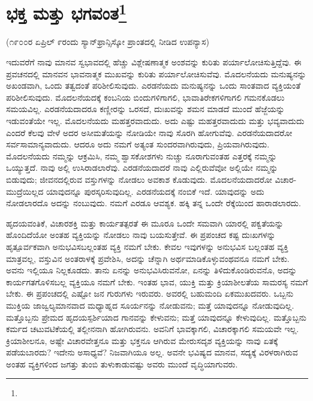 
\chapter{ಭಕ್ತ ಮತ್ತು ಭಗವಂತ\protect\footnote{}}

\begin{center}
(೧೯೦೦ರ ಏಪ್ರಿಲ್ ೯ರಂದು ಸ್ಯಾನ್‌ಫ್ರಾನ್ಸಿಸ್ಕೋ ಪ್ರಾಂತದಲ್ಲಿ ನೀಡಿದ ಉಪನ್ಯಾಸ)
\end{center}

ಇದುವರೆಗೆ ನಾವು ಮಾನವ ಸ್ವಭಾವದಲ್ಲಿ ಹೆಚ್ಚು ವಿಶ್ಲೇಷಣಾತ್ಮಕ ಅಂಶವನ್ನು ಕುರಿತು ಪರ್ಯಾಲೋಚಿಸುತ್ತಿದ್ದೆವು. ಈ ಪ್ರವಚನದಲ್ಲಿ ಮಾನವನ ಭಾವನಾತ್ಮಕ ಮುಖವನ್ನು ಕುರಿತು ಪರ್ಯಾಲೋಚಿಸುವೆವು. ಮೊದಲನೆಯದು ಮನುಷ್ಯನನ್ನು ಅಖಂಡವಾಗಿ, ಒಂದು ತತ್ವದಂತೆ ಪರಿಶೀಲಿಸುವುದು. ಎರಡನೆಯದು ಮನುಷ್ಯನನ್ನು ಒಂದು ಸಾಂತವಾದ ವ್ಯಕ್ತಿಯಂತೆ ಪರಿಶೀಲಿಸುವುದು. ಮೊದಲನೆಯದಕ್ಕೆ ಕಂಬನಿಯ ಬಿಂದುಗಳಿಗಾಗಲಿ, ಭಾವಾತಿರೇಕಗಳಿಗಾಗಲಿ ಗಮನಕೊಡಲು ಸಮಯವಿಲ್ಲ. ಎರಡನೆಯದಾದರೂ ಕಣ್ಣೀರನ್ನು ಒರಸದೆ, ದುಃಖವನ್ನು ಶಮನ ಮಾಡದೆ ಮುಂದೆ ಹೆಜ್ಜೆಯನ್ನು ಇಡುವಂತೆಯೇ ಇಲ್ಲ. ಮೊದಲನೆಯದು ಮಹತ್ತರವಾದುದು. ಅದು ಎಷ್ಟು ಮಹತ್ತರವಾದುದು ಮತ್ತು ಭವ್ಯವಾದುದು ಎಂದರೆ ಕೆಲವು ವೇಳೆ ಅದರ ಅಸೀಮತೆಯನ್ನು ನೋಡಿಯೇ ನಾವು ಸೊರಗಿ ಹೋಗುವೆವು. ಎರಡನೆಯದಾದರೋ ಸರ್ವಸಾಮಾನ್ಯವಾದುದು. ಆದರೂ ಅದು ನಮಗೆ ಅತ್ಯಂತ ಸುಂದರವಾಗಿರುವುದು, ಪ್ರಿಯವಾಗಿರುವುದು. ಮೊದಲನೆಯದು ನಮ್ಮನ್ನು ಆಕ್ರಮಿಸಿ, ನಮ್ಮ ಶ್ವಾಸಕೋಶಗಳು ನುಚ್ಚು ನೂರಾಗುವಂತಹ ಎತ್ತರಕ್ಕೆ ನಮ್ಮನ್ನು ಒಯ್ಯುತ್ತದೆ. ನಾವು ಅಲ್ಲಿ ಉಸಿರಾಡಲಾರೆವು. ಎರಡನೆಯದಾದರೆ ನಾವು ಎಲ್ಲಿರುವೆವೋ ಅಲ್ಲಿಯೇ ನಮ್ಮನ್ನು ಬಿಡುವುದು; ಜೀವನದಲ್ಲಿರುವ ವಸ್ತುಗಳನ್ನು ನೋಡಲು ಅವಕಾಶ ಕೊಡುವುದು. ಮೊದಲನೆಯದಾದರೋ ವಿಚಾರ-ಮುದ್ರೆಯಿಲ್ಲದ ಯಾವುದನ್ನೂ ಪುರಸ್ಕರಿಸುವುದಿಲ್ಲ. ಎರಡನೆಯದಕ್ಕೆ ನಂಬಿಕೆ ಇದೆ. ಯಾವುದನ್ನು ಅದು ನೋಡಲಾರದೊ ಅದನ್ನು ನಂಬುವುದು. ನಮಗೆ ಎರಡೂ ಆವಶ್ಯಕ. ಹಕ್ಕಿ ತನ್ನ ಒಂದೇ ರೆಕ್ಕೆಯಿಂದ ಹಾರಾಡಲಾರದು.

ಹೃದಯವಂತಿಕೆ, ವಿಚಾರಶಕ್ತಿ ಮತ್ತು ಕಾರ್ಯತತ್ಪರತೆ ಈ ಮೂರೂ ಒಂದೇ ಸಮವಾಗಿ ಯಾರಲ್ಲಿ ಪಕ್ವತೆಯನ್ನು ಹೊಂದಿದೆಯೋ ಅಂತಹ ವ್ಯಕ್ತಿಯನ್ನು ನೋಡಲು ನಾವು ಬಯಸುತ್ತೇವೆ. ಈ ಪ್ರಪಂಚದ ಕಷ್ಟ ದುಃಖಗಳನ್ನು ಹೃತ್ಪೂರ್ವಕವಾಗಿ ಅನುಭವಿಸಬಲ್ಲಂತಹ ವ್ಯಕ್ತಿ ನಮಗೆ ಬೇಕು. ಕೇವಲ ಇವುಗಳನ್ನು ಅನುಭವಿಸ ಬಲ್ಲಂತಹ ವ್ಯಕ್ತಿ ಮಾತ್ರವಲ್ಲ, ವಸ್ತುವಿನ ಅಂತರಾಳಕ್ಕೆ ಪ್ರವೇಶಿಸಿ, ಅದನ್ನು ಚೆನ್ನಾಗಿ ಅರ್ಥಮಾಡಿಕೊಳ್ಳುವಂಥವನೂ ನಮಗೆ ಬೇಕು. ಅವನು ಇಲ್ಲಿಯೂ ನಿಲ್ಲಕೂಡದು. ತಾನು ಏನನ್ನು ಅನುಭವಿಸಿರುವನೋ, ಏನನ್ನು ತಿಳಿದುಕೊಂಡಿರುವನೊ, ಅದನ್ನು ಕಾರ್ಯಗತಗೊಳಿಸಬಲ್ಲ ವ್ಯಕ್ತಿಯೂ ನಮಗೆ ಬೇಕು. ಇಂತಹ ಭಾವ, ಯುಕ್ತಿ ಮತ್ತು ಕ್ರಿಯಾಶೀಲತೆಯ ಸಾಮರಸ್ಯ ನಮಗೆ ಬೇಕು. ಈ ಪ್ರಪಂಚದಲ್ಲಿ ಎಷ್ಟೋ ಜನ ಗುರುಗಳು ಇರುವರು. ಅವರಲ್ಲಿ ಬಹುಮಂದಿ ಏಕಮುಖದವರು. ಒಬ್ಬನು ಮುಕ್ತಿಯ ಜಾಜ್ವಲ್ಯಮಾನವಾದ ಮಧ್ಯಾಹ್ನದ ಸೂರ್ಯನನ್ನು ನೋಡುವನು; ಮತ್ತೆ ಯಾವುದನ್ನೂ ನೋಡುವುದಿಲ್ಲ. ಮತ್ತೊಬ್ಬನು ಪ್ರೇಮದ ಹೃದಯಸ್ಪರ್ಶಿಯಾದ ಗಾನವನ್ನು ಕೇಳುವನು; ಮತ್ತೆ ಯಾವುದನ್ನೂ ಕೇಳುವುದಿಲ್ಲ. ಮತ್ತೊಬ್ಬನು ಕರ್ಮದ ಚಟುವಟಿಕೆಯಲ್ಲಿ ತಲ್ಲೀನನಾಗಿ ಹೋಗಿರುವನು. ಅವನಿಗೆ ಭಾವಕ್ಕಾಗಲಿ, ವಿಚಾರಕ್ಕಾಗಲಿ ಸಮಯವೇ ಇಲ್ಲ. ಕ್ರಿಯಾಶೀಲನೂ, ಅಷ್ಟೇ ವಿಚಾರವೇತ್ತನೂ ಮತ್ತು ಭಕ್ತನೂ ಆಗಿರುವ ಮೇರುಸದೃಶ ವ್ಯಕ್ತಿಯನ್ನು ನಾವು ಏತಕ್ಕೆ ಪಡೆಯಬಾರದು? ಇದೇನು ಅಸಾಧ್ಯವೆ? ನಿಜವಾಗಿಯೂ ಅಲ್ಲ. ಅವನೇ ಭವಿಷ್ಯದ ಮಾನವ, ಸದ್ಯಕ್ಕೆ ವಿರಳರಾಗಿರುವ ಅಂತಹ ವ್ಯಕ್ತಿಗಳಿಂದ ಜಗತ್ತು ತುಂಬಿ ತುಳುಕಾಡುವಷ್ಟು ಅವರು ಮುಂದೆ ವೃದ್ಧಿಯಾಗುವರು.

